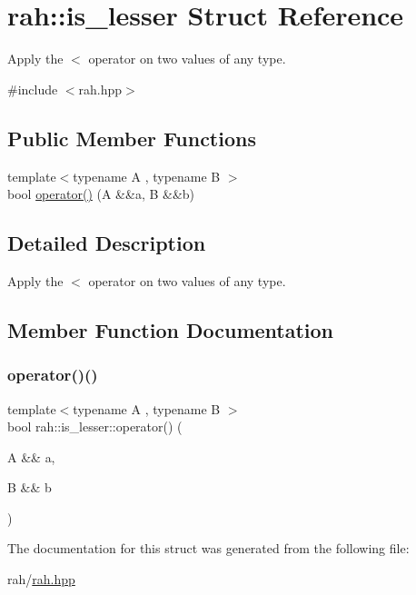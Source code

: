 \hypertarget{structrah_1_1is__lesser}{}\section{rah\+::is\+\_\+lesser Struct Reference}
\label{structrah_1_1is__lesser}


Apply the \textquotesingle{}$<$\textquotesingle{} operator on two values of any type.  




{\ttfamily \#include $<$rah.\+hpp$>$}

\subsection*{Public Member Functions}
\begin{DoxyCompactItemize}
\item 
{\footnotesize template$<$typename A , typename B $>$ }\\bool \mbox{\hyperlink{structrah_1_1is__lesser_a250017bbf05b42571b4846f3c0695a8d}{operator()}} (A \&\&a, B \&\&b)
\end{DoxyCompactItemize}


\subsection{Detailed Description}
Apply the \textquotesingle{}$<$\textquotesingle{} operator on two values of any type. 

\subsection{Member Function Documentation}
\mbox{\label{structrah_1_1is__lesser_a250017bbf05b42571b4846f3c0695a8d}} 
\subsubsection{\texorpdfstring{operator()()}{operator()()}}
{\footnotesize\ttfamily template$<$typename A , typename B $>$ \\
bool rah\+::is\+\_\+lesser\+::operator() (\begin{DoxyParamCaption}\item[{A \&\&}]{a,  }\item[{B \&\&}]{b }\end{DoxyParamCaption})\hspace{0.3cm}{\ttfamily [inline]}}



The documentation for this struct was generated from the following file\+:\begin{DoxyCompactItemize}
\item 
rah/\mbox{\hyperlink{rah_8hpp}{rah.\+hpp}}\end{DoxyCompactItemize}
